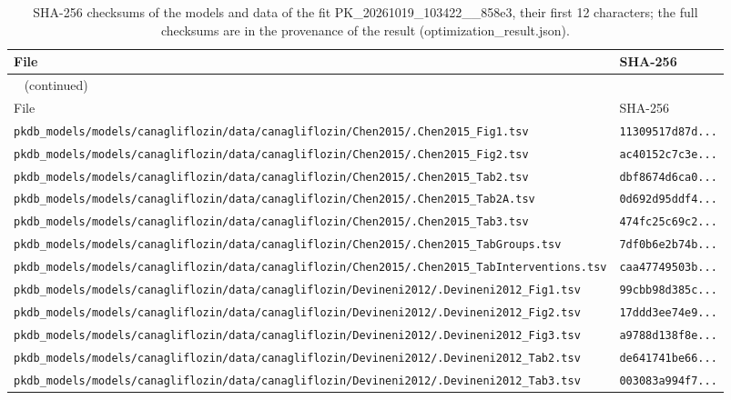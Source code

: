 \documentclass{article}
\begin{document}
\begin{longtable}{ll}
\caption{SHA-256 checksums of the models and data of the fit PK\_20261019\_103422\_\_858e3, their first 12 characters; the full checksums are in the provenance of the result (optimization\_result.json).}\label{tab:checksums:PK_20261019_103422__858e3} \\
\toprule
File & SHA-256 \\
\midrule
\endfirsthead
\multicolumn{2}{l}{\small\tablename~\thetable{} (continued)} \\
\toprule
File & SHA-256 \\
\midrule
\endhead
\bottomrule
\endlastfoot
\texttt{pkdb\_models/models/canagliflozin/data/canagliflozin/Chen2015/.Chen2015\_Fig1.tsv} & \texttt{11309517d87d...} \\
\texttt{pkdb\_models/models/canagliflozin/data/canagliflozin/Chen2015/.Chen2015\_Fig2.tsv} & \texttt{ac40152c7c3e...} \\
\texttt{pkdb\_models/models/canagliflozin/data/canagliflozin/Chen2015/.Chen2015\_Tab2.tsv} & \texttt{dbf8674d6ca0...} \\
\texttt{pkdb\_models/models/canagliflozin/data/canagliflozin/Chen2015/.Chen2015\_Tab2A.tsv} & \texttt{0d692d95ddf4...} \\
\texttt{pkdb\_models/models/canagliflozin/data/canagliflozin/Chen2015/.Chen2015\_Tab3.tsv} & \texttt{474fc25c69c2...} \\
\texttt{pkdb\_models/models/canagliflozin/data/canagliflozin/Chen2015/.Chen2015\_TabGroups.tsv} & \texttt{7df0b6e2b74b...} \\
\texttt{pkdb\_models/models/canagliflozin/data/canagliflozin/Chen2015/.Chen2015\_TabInterventions.tsv} & \texttt{caa47749503b...} \\
\texttt{pkdb\_models/models/canagliflozin/data/canagliflozin/Devineni2012/.Devineni2012\_Fig1.tsv} & \texttt{99cbb98d385c...} \\
\texttt{pkdb\_models/models/canagliflozin/data/canagliflozin/Devineni2012/.Devineni2012\_Fig2.tsv} & \texttt{17ddd3ee74e9...} \\
\texttt{pkdb\_models/models/canagliflozin/data/canagliflozin/Devineni2012/.Devineni2012\_Fig3.tsv} & \texttt{a9788d138f8e...} \\
\texttt{pkdb\_models/models/canagliflozin/data/canagliflozin/Devineni2012/.Devineni2012\_Tab2.tsv} & \texttt{de641741be66...} \\
\texttt{pkdb\_models/models/canagliflozin/data/canagliflozin/Devineni2012/.Devineni2012\_Tab3.tsv} & \texttt{003083a994f7...} \\

\end{longtable}
\end{document}
